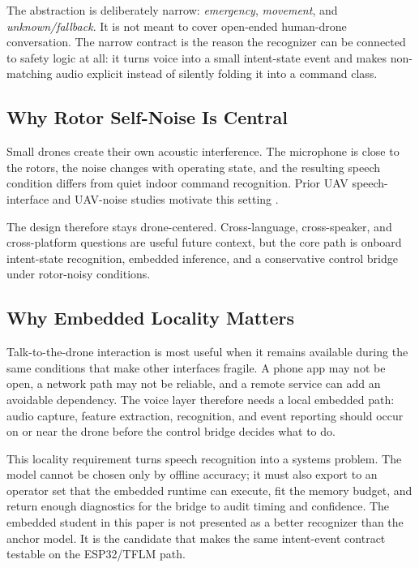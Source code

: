 The abstraction is deliberately narrow: \emph{emergency}, \emph{movement}, and \emph{unknown/fallback}. It is not meant to cover open-ended human-drone conversation. The narrow contract is the reason the recognizer can be connected to safety logic at all: it turns voice into a small intent-state event and makes non-matching audio explicit instead of silently folding it into a command class.

\subsection{Why Rotor Self-Noise Is Central}

Small drones create their own acoustic interference. The microphone is close to the rotors, the noise changes with operating state, and the resulting speech condition differs from quiet indoor command recognition. Prior UAV speech-interface and UAV-noise studies motivate this setting \cite{oneata19_interspeech,oneata2021multimodal,miesikowska2021uavnoise,park2023uavvehicle}.

The design therefore stays drone-centered. Cross-language, cross-speaker, and cross-platform questions are useful future context, but the core path is onboard intent-state recognition, embedded inference, and a conservative control bridge under rotor-noisy conditions.

\subsection{Why Embedded Locality Matters}

Talk-to-the-drone interaction is most useful when it remains available during the same conditions that make other interfaces fragile. A phone app may not be open, a network path may not be reliable, and a remote service can add an avoidable dependency. The voice layer therefore needs a local embedded path: audio capture, feature extraction, recognition, and event reporting should occur on or near the drone before the control bridge decides what to do.

This locality requirement turns speech recognition into a systems problem. The model cannot be chosen only by offline accuracy; it must also export to an operator set that the embedded runtime can execute, fit the memory budget, and return enough diagnostics for the bridge to audit timing and confidence. The embedded student in this paper is not presented as a better recognizer than the anchor model. It is the candidate that makes the same intent-event contract testable on the ESP32/TFLM path.

